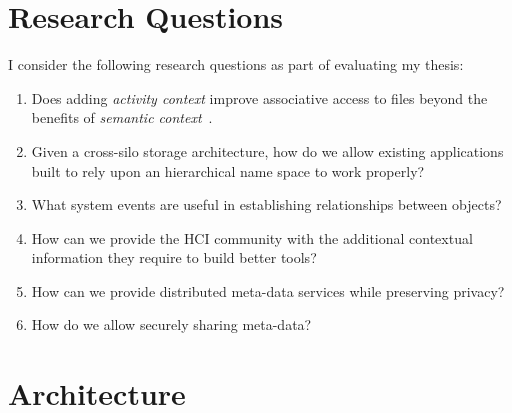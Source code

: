 \section{Research Questions}
\label{ch:model:sec:research-questions}


I consider the following research questions as part of evaluating my
thesis:

\begin{enumerate}

    \item \label{rq:pragmatics} Does adding \emph{activity context} improve
          associative access to files beyond the benefits of \emph{semantic
              context}~\cite{gifford1991semantic}.

    \item \label{rq:no-hierarchy} Given a cross-silo storage architecture, how
          do we allow existing applications built to rely upon an hierarchical name
          space to work properly? 


    \item \label{rq:events} What system events are useful in establishing
          relationships between objects?

    \item \label{rq:hci} How can we provide the \ac{HCI} community with the
          additional contextual information they require to build better tools?

    \item \label{req:privacy} How can we provide distributed meta-data services
          while preserving privacy?

    \item \label{req:security} How do we allow securely sharing meta-data?

\end{enumerate}



\section{\system Architecture}
\label{ch:model:sec:architecture}


